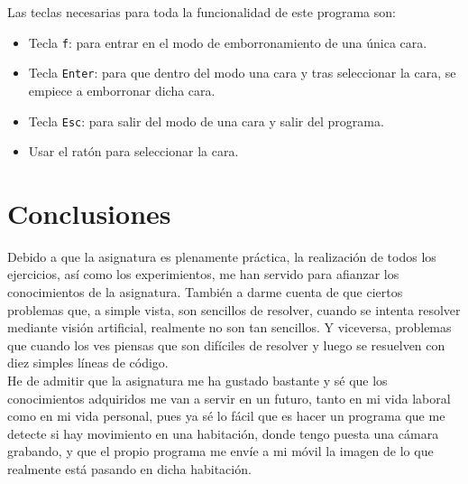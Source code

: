 \documentclass[a4paper,10pt,titlepage,oneside,openright]{book}
\begin{document}
Las teclas necesarias para toda la funcionalidad de este programa son:
\begin{itemize}
 \item Tecla \texttt{f}: para entrar en el modo de emborronamiento de una única cara.
 \item Tecla \texttt{Enter}: para que dentro del modo una cara y tras seleccionar la cara, se empiece a emborronar dicha cara.
 \item Tecla \texttt{Esc}: para salir del modo de una cara y salir del programa.
 \item Usar el ratón para seleccionar la cara.
\end{itemize}



\medskip
\section{Conclusiones}
Debido a que la asignatura es plenamente práctica, la realización de todos los ejercicios, así como los experimientos, me han servido para afianzar los conocimientos de la asignatura. También a darme cuenta de que ciertos problemas que, a simple vista, son sencillos de resolver, cuando se intenta resolver mediante visión artificial, realmente no son tan sencillos. Y viceversa, problemas que cuando los ves piensas que son difíciles de resolver y luego se resuelven con diez simples líneas de código. \\

He de admitir que la asignatura me ha gustado bastante y sé que los conocimientos adquiridos me van a servir en un futuro, tanto en mi vida laboral como en mi vida personal, pues ya sé lo fácil que es hacer un programa que me detecte si hay movimiento en una habitación, donde tengo puesta una cámara grabando, y que el propio programa me envíe a mi móvil la imagen de lo que realmente está pasando en dicha habitación.

\newpage

\end{document}
